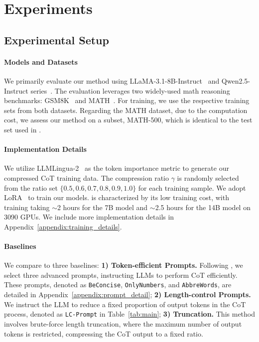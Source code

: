 \section{Experiments}
\subsection{Experimental Setup}
\label{sec:exp_setup}

\paragraph{Models and Datasets} 
We primarily evaluate our method using LLaMA-3.1-8B-Instruct~\cite{dubey:2024llama3} and Qwen2.5-Instruct series~\cite{Qwen2}. The evaluation leverages two widely-used math reasoning benchmarks: GSM8K~\citep{Cobbe:2021gsm8k} and MATH~\cite{math}. For training, we use the respective training sets from both datasets. Regarding the MATH dataset, due to the computation cost, we assess our method on a subset, MATH-500, which is identical to the test set used in \citet{Lightman:2024verify}.

\paragraph{Implementation Details} 
We utilize LLMLingua-2~\cite{pan:2024llmlingua2} as the token importance metric to generate our compressed CoT training data. The compression ratio $\gamma$ is randomly selected from the ratio set $\{0.5, 0.6, 0.7, 0.8, 0.9, 1.0\}$ for each training sample. We adopt LoRA~\cite{lora} to train our models. \method is characterized by its low training cost, with training taking $\sim$2 hours for the 7B model and $\sim$2.5 hours for the 14B model on 3090 GPUs. We include more implementation details in Appendix~\ref{appendix:training_details}.

\paragraph{Baselines} 
We compare \method to three baselines: \textbf{1) Token-efficient Prompts.} Following \citet{Lee:2025Complexity}, we select three advanced prompts, instructing LLMs to perform CoT efficiently. These prompts, denoted as \texttt{BeConcise}, \texttt{OnlyNumbers}, and \texttt{AbbreWords}, are detailed in Appendix~\ref{appendix:prompt_detail}; \textbf{2) Length-control Prompts.} We instruct the LLM to reduce a fixed proportion of output tokens in the CoT process, denoted as \texttt{LC-Prompt} in Table~\ref{tab:main}; \textbf{3) Truncation.} This method involves brute-force length truncation, where the maximum number of output tokens is restricted, compressing the CoT output to a fixed ratio.


